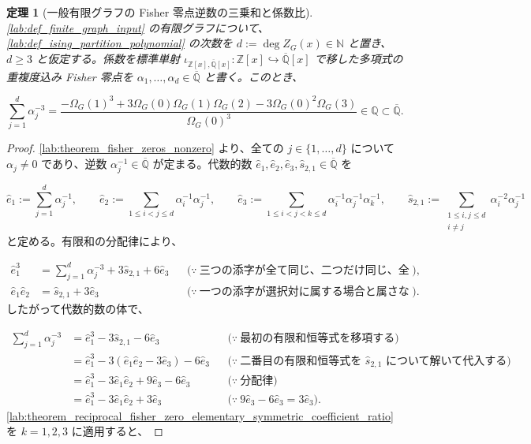 \documentclass[11pt,a4paper]{article}
\newtheorem{theorem}[definition]{定理}
\theoremstyle{remark}
\begin{document}
\begin{theorem}[一般有限グラフの Fisher 零点逆数の三乗和と係数比]\label{lab:theorem_reciprocal_fisher_zero_cube_sum_coefficient_ratio}
\cref{lab:def_finite_graph_input}
 の有限グラフについて、
\cref{lab:def_ising_partition_polynomial}
 の次数を
$d:=\deg Z_G(x)\in\mathbb N$
 と置き、
$d\ge3$
 と仮定する。係数を標準単射
$\iota_{\mathbb Z[x],\overline{\mathbb Q}[x]}:\mathbb Z[x]\hookrightarrow\overline{\mathbb Q}[x]$
 で移した多項式の重複度込み Fisher 零点を
$\alpha_1,\ldots,\alpha_d\in\overline{\mathbb Q}$
 と書く。このとき、

\[\sum_{j=1}^{d}\alpha_j^{-3}
=
\frac{
  -\Omega_G(1)^3
  +3\Omega_G(0)\Omega_G(1)\Omega_G(2)
  -3\Omega_G(0)^2\Omega_G(3)
}{
  \Omega_G(0)^3
}
\in\mathbb Q
\subset\overline{\mathbb Q}.\]
\end{theorem}
\begin{proof}
\cref{lab:theorem_fisher_zeros_nonzero}
 より、全ての
$j\in\{1,\ldots,d\}$
 について
$\alpha_j\ne0$
 であり、逆数
$\alpha_j^{-1}\in\overline{\mathbb Q}$
 が定まる。代数的数
$\widehat e_1,\widehat e_2,\widehat e_3,\widehat s_{2,1}\in\overline{\mathbb Q}$
 を

\[\widehat e_1:=\sum_{j=1}^{d}\alpha_j^{-1},
\qquad
\widehat e_2:=\sum_{1\le i<j\le d}\alpha_i^{-1}\alpha_j^{-1},
\qquad
\widehat e_3:=\sum_{1\le i<j<k\le d}\alpha_i^{-1}\alpha_j^{-1}\alpha_k^{-1},
\qquad
\widehat s_{2,1}:=\sum_{\substack{1\le i,j\le d\\i\ne j}}\alpha_i^{-2}\alpha_j^{-1}\]
と定める。有限和の分配律により、

\[\begin{aligned}
\widehat e_1^3
&=
\sum_{j=1}^{d}\alpha_j^{-3}+3\widehat s_{2,1}+6\widehat e_3
&&\bigl(\because\ \text{三つの添字が全て同じ、二つだけ同じ、全て異なる場合へ分ける}\bigr),\\
\widehat e_1\widehat e_2
&=
\widehat s_{2,1}+3\widehat e_3
&&\bigl(\because\ \text{一つの添字が選択対に属する場合と属さない場合へ分ける}\bigr).
\end{aligned}\]
したがって代数的数の体で、

\[\begin{aligned}
\sum_{j=1}^{d}\alpha_j^{-3}
&=
\widehat e_1^3-3\widehat s_{2,1}-6\widehat e_3
&&\bigl(\because\ \text{最初の有限和恒等式を移項する}\bigr)\\
&=
\widehat e_1^3-3(\widehat e_1\widehat e_2-3\widehat e_3)-6\widehat e_3
&&\bigl(\because\ \text{二番目の有限和恒等式を }\widehat s_{2,1}\text{ について解いて代入する}\bigr)\\
&=
\widehat e_1^3-3\widehat e_1\widehat e_2+9\widehat e_3-6\widehat e_3
&&\bigl(\because\ \text{分配律}\bigr)\\
&=
\widehat e_1^3-3\widehat e_1\widehat e_2+3\widehat e_3
&&\bigl(\because\ 9\widehat e_3-6\widehat e_3=3\widehat e_3\bigr).
\end{aligned}\]
\cref{lab:theorem_reciprocal_fisher_zero_elementary_symmetric_coefficient_ratio}
 を
$k=1,2,3$
 に適用すると、


\end{proof}
\end{document}
